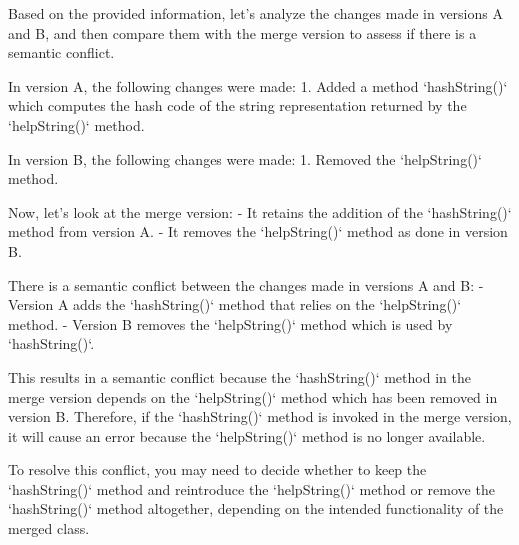 \begin{answer}
  Based on the provided information, let's analyze the changes made in versions A and B, and then compare them with the merge version to assess if there is a semantic conflict.

  In version A, the following changes were made:
  1. Added a method `hashString()` which computes the hash code of the string representation returned by the `helpString()` method.
  
  In version B, the following changes were made:
  1. Removed the `helpString()` method.
  
  Now, let's look at the merge version:
  - It retains the addition of the `hashString()` method from version A.
  - It removes the `helpString()` method as done in version B.
  
  There is a semantic conflict between the changes made in versions A and B:
  - Version A adds the `hashString()` method that relies on the `helpString()` method.
  - Version B removes the `helpString()` method which is used by `hashString()`.
  
  This results in a semantic conflict because the `hashString()` method in the merge version depends on the `helpString()` method which has been removed in version B. Therefore, if the `hashString()` method is invoked in the merge version, it will cause an error because the `helpString()` method is no longer available.
  
  To resolve this conflict, you may need to decide whether to keep the `hashString()` method and reintroduce the `helpString()` method or remove the `hashString()` method altogether, depending on the intended functionality of the merged class.
\end{answer}